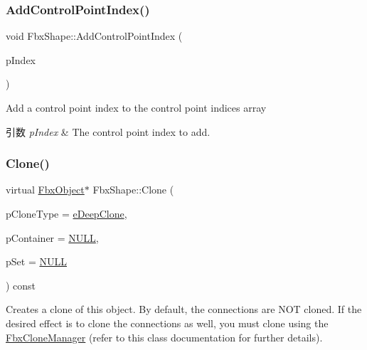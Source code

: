 \subsubsection{\texorpdfstring{Add\+Control\+Point\+Index()}{AddControlPointIndex()}}
{\footnotesize\ttfamily void Fbx\+Shape\+::\+Add\+Control\+Point\+Index (\begin{DoxyParamCaption}\item[{int}]{p\+Index }\end{DoxyParamCaption})}

Add a control point index to the control point indices array 
\begin{DoxyParams}{引数}
{\em p\+Index} & The control point index to add. \\
\hline
\end{DoxyParams}
\mbox{\label{class_fbx_shape_aca0dfb34dc9b38d5fdbf0d004fc60697}} 
\subsubsection{\texorpdfstring{Clone()}{Clone()}}
{\footnotesize\ttfamily virtual \hyperlink{class_fbx_object}{Fbx\+Object}$\ast$ Fbx\+Shape\+::\+Clone (\begin{DoxyParamCaption}\item[{\hyperlink{class_fbx_object_a9f5626b2d2135684d6ea1e6e4ad2acbb}{Fbx\+Object\+::\+E\+Clone\+Type}}]{p\+Clone\+Type = {\ttfamily \hyperlink{class_fbx_object_a9f5626b2d2135684d6ea1e6e4ad2acbbaacdf137ca059c572798287e98c4236d0}{e\+Deep\+Clone}},  }\item[{\hyperlink{class_fbx_object}{Fbx\+Object} $\ast$}]{p\+Container = {\ttfamily \hyperlink{fbxarch_8h_a070d2ce7b6bb7e5c05602aa8c308d0c4}{N\+U\+LL}},  }\item[{void $\ast$}]{p\+Set = {\ttfamily \hyperlink{fbxarch_8h_a070d2ce7b6bb7e5c05602aa8c308d0c4}{N\+U\+LL}} }\end{DoxyParamCaption}) const\hspace{0.3cm}{\ttfamily [virtual]}}

Creates a clone of this object. By default, the connections are N\+OT cloned. If the desired effect is to clone the connections as well, you must clone using the \hyperlink{class_fbx_clone_manager}{Fbx\+Clone\+Manager} (refer to this class documentation for further details).


